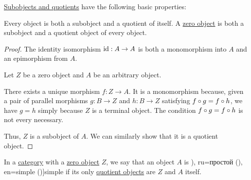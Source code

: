 \begin{proposition}\label{thm:def:subobject_and_quotient}
  \hyperref[def:subobject_and_quotient]{Subobjects and quotients} have the following basic properties:
  \begin{thmenum}
     Every object is both a subobject and a quotient of itself.
     A \hyperref[def:universal_objects/zero]{zero object} is both a subobject and a quotient object of every object.
  \end{thmenum}
\end{proposition}
\begin{proof}
   The identity isomorphism \( \operatorname{id}: A \to A \) is both a monomorphism into \( A \) and an epimorphism from \( A \).

   Let \( Z \) be a zero object and \( A \) be an arbitrary object.

  There exists a unique morphism \( f: Z \to A \). It is a monomorphism because, given a pair of parallel morphisms \( g: B \to Z \) and \( h: B \to Z \) satisfying \( f \bincirc g = f \bincirc h \), we have \( g = h \) simply because \( Z \) is a terminal object. The condition \( f \bincirc g = f \bincirc h \) is not every necessary.

  Thus, \( Z \) is a subobject of \( A \). We can similarly show that it is a quotient object.
\end{proof}

\begin{definition}\label{def:simple_object}\mimprovised
  In a \hyperref[def:category]{category} with a \hyperref[def:universal_objects/zero]{zero object} \( Z \), we say that an object \( A \) is \term[bg=прост (\cite[307]{ГеновМиховскиМоллов1991Алгебра}), ru=простой (\cite[99]{Шафаревич1999Алгебра}), en=simple (\cite[643]{Lang2002Algebra})]{simple} if its only \hyperref[def:subobject_and_quotient]{quotient objects} are \( Z \) and \( A \) itself.
\end{definition}

